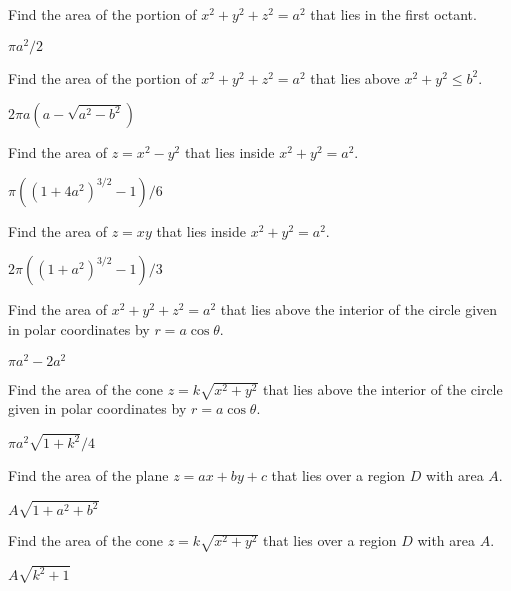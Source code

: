 \begin{enumialphparenastyle}
\begin{ex}
Find the area of the portion of $x^2+y^2+z^2=a^2$ that lies
in the first octant.
\begin{sol}
	$\pi a^2/2$
\end{sol}
\end{ex}

\begin{ex}
Find the area of the portion of $x^2+y^2+z^2=a^2$ that lies
above $x^2+y^2\le b^2$.
\begin{sol}
	$2\pi a(a-\sqrt{a^2-b^2})$
\end{sol}
\end{ex}

\begin{ex}
Find the area of $z=x^2-y^2$ that lies inside $x^2+y^2=a^2$.
\begin{sol}
	$\pi((1+4a^2)^{3/2}-1)/6$
\end{sol}
\end{ex}

\begin{ex}
Find the area of $z=xy$ that lies inside $x^2+y^2=a^2$.
\begin{sol}
	$2\pi((1+a^2)^{3/2}-1)/3$
\end{sol}
\end{ex}

\begin{ex}
Find the area of $x^2+y^2+z^2=a^2$ 
that lies above the interior of the circle given in polar coordinates
by $r=a\cos \theta$.
\begin{sol}
	$\pi a^2-2a^2$
\end{sol}
\end{ex}

\begin{ex}
Find the area of the cone $z=k\sqrt{x^2+y^2}$
that lies above the interior of the circle given in polar coordinates
by $r=a\cos \theta$.
\begin{sol}
	$\pi a^2\sqrt{1+k^2}/4$
\end{sol}
\end{ex}

\begin{ex}
Find the area of the plane $z=ax+by+c$ that lies over a
region $D$ with area $A$.
\begin{sol}
	$A\sqrt{1+a^2+b^2}$
\end{sol}
\end{ex}

\begin{ex}
Find the area of the cone $z=k\sqrt{x^2+y^2}$ that lies over a
region $D$ with area $A$.
\begin{sol}
	$A\sqrt{k^2+1}$
\end{sol}
\end{ex}


\end{enumialphparenastyle}
